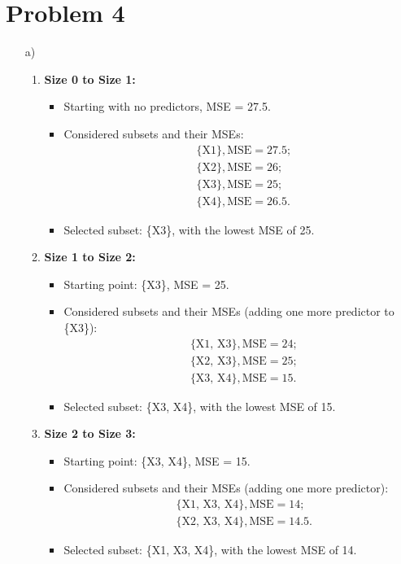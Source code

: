 \documentclass{article}
\begin{document}
\section*{Problem 4}
\begin{itemize}
    \item [a)]

\begin{enumerate}
    \item \textbf{Size 0 to Size 1:}
    \begin{itemize}
        \item Starting with no predictors, MSE = 27.5.
        \item Considered subsets and their MSEs:
        \begin{align*}
            &\text{\{X1\}}, \text{MSE} = 27.5; \\
            &\text{\{X2\}}, \text{MSE} = 26; \\
            &\text{\{X3\}}, \text{MSE} = 25; \\
            &\text{\{X4\}}, \text{MSE} = 26.5.
        \end{align*}
        \item Selected subset: \{X3\}, with the lowest MSE of 25.
    \end{itemize}
    
    \item \textbf{Size 1 to Size 2:}
    \begin{itemize}
        \item Starting point: \{X3\}, MSE = 25.
        \item Considered subsets and their MSEs (adding one more predictor to \{X3\}):
        \begin{align*}
            &\text{\{X1, X3\}}, \text{MSE} = 24; \\
            &\text{\{X2, X3\}}, \text{MSE} = 25; \\
            &\text{\{X3, X4\}}, \text{MSE} = 15.
        \end{align*}
        \item Selected subset: \{X3, X4\}, with the lowest MSE of 15.
    \end{itemize}
    
    \item \textbf{Size 2 to Size 3:}
    \begin{itemize}
        \item Starting point: \{X3, X4\}, MSE = 15.
        \item Considered subsets and their MSEs (adding one more predictor):
        \begin{align*}
            &\text{\{X1, X3, X4\}}, \text{MSE} = 14; \\
            &\text{\{X2, X3, X4\}}, \text{MSE} = 14.5.
        \end{align*}
        \item Selected subset: \{X1, X3, X4\}, with the lowest MSE of 14.
    \end{itemize}
    

\end{enumerate}
\end{itemize}
\end{document}
